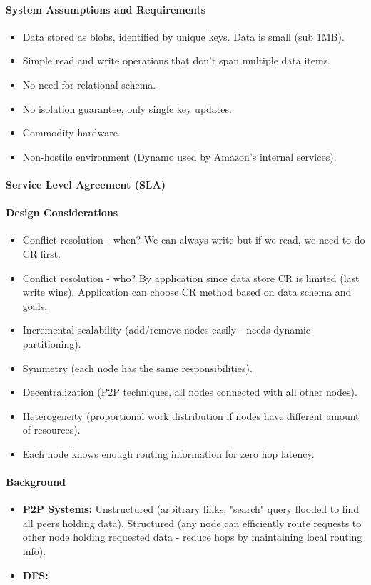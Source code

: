 \paragraph{System Assumptions and Requirements}
\begin{itemize}
    \item Data stored as blobs, identified by unique keys. Data is small (sub 1MB).
    \item Simple read and write operations that don't span multiple data items. 
    \item No need for relational schema.
    \item No isolation guarantee, only single key updates.
    \item Commodity hardware.
    \item Non-hostile environment (Dynamo used by Amazon's internal services).
\end{itemize}

\paragraph{Service Level Agreement (SLA)}

\paragraph{Design Considerations}
\begin{itemize}
    \item Conflict resolution - when? We can always write but if we read, we need to do CR first.
    \item Conflict resolution - who? By application since data store CR is limited (last write wins). Application can choose CR method based on data schema and goals.
    \item Incremental scalability (add/remove nodes easily - needs dynamic partitioning).
    \item Symmetry (each node has the same responsibilities).
    \item Decentralization (P2P techniques, all nodes connected with all other nodes).
    \item Heterogeneity (proportional work distribution if nodes have different amount of resources).
    \item Each node knows enough routing information for zero hop latency.
\end{itemize}

\paragraph{Background}
\begin{itemize}
    \item \textbf{P2P Systems:} Unstructured (arbitrary links, "search" query flooded to find all peers holding data). Structured (any node can efficiently route requests to other node holding requested data - reduce hops by maintaining local routing info).
    \item \textbf{DFS:} %
\end{itemize}

